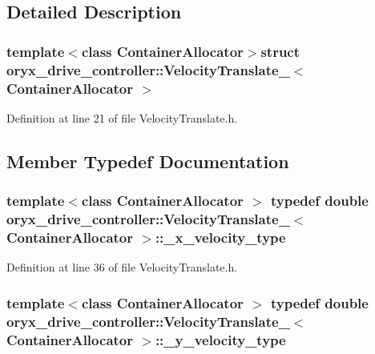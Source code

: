 \subsection{\-Detailed \-Description}
\subsubsection*{template$<$class Container\-Allocator$>$struct oryx\-\_\-drive\-\_\-controller\-::\-Velocity\-Translate\-\_\-$<$ Container\-Allocator $>$}



\-Definition at line 21 of file \-Velocity\-Translate.\-h.



\subsection{\-Member \-Typedef \-Documentation}
\subsubsection[{\-\_\-x\-\_\-velocity\-\_\-type}]{\setlength{\rightskip}{0pt plus 5cm}template$<$class Container\-Allocator $>$ typedef double {\bf oryx\-\_\-drive\-\_\-controller\-::\-Velocity\-Translate\-\_\-}$<$ \-Container\-Allocator $>$\-::{\bf \-\_\-x\-\_\-velocity\-\_\-type}}\label{structoryx__drive__controller_1_1VelocityTranslate___ad236999fdc5d1b25f7145c0428a95494}


\-Definition at line 36 of file \-Velocity\-Translate.\-h.

\subsubsection[{\-\_\-y\-\_\-velocity\-\_\-type}]{\setlength{\rightskip}{0pt plus 5cm}template$<$class Container\-Allocator $>$ typedef double {\bf oryx\-\_\-drive\-\_\-controller\-::\-Velocity\-Translate\-\_\-}$<$ \-Container\-Allocator $>$\-::{\bf \-\_\-y\-\_\-velocity\-\_\-type}}\label{structoryx__drive__controller_1_1VelocityTranslate___a361f6e4ab3394edecf865d4ac9938110}


